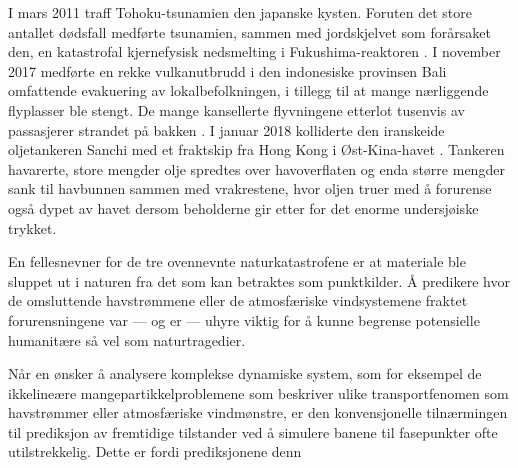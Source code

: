 I mars 2011 traff Tohoku-tsunamien den japanske kysten. Foruten det store
antallet dødsfall medførte tsunamien, sammen med jordskjelvet som forårsaket
den, en katastrofal kjernefysisk nedsmelting i Fukushima-reaktoren
\parencite{atomic2015fukushima}. I
november 2017 medførte en rekke vulkanutbrudd i den indonesiske provinsen
Bali omfattende evakuering av lokalbefolkningen, i tillegg til at mange
nærliggende flyplasser ble stengt. De mange kansellerte flyvningene etterlot
tusenvis av passasjerer strandet på bakken \parencite{kapoor2017bali}. I januar
2018 kolliderte den iranskeide oljetankeren Sanchi med et fraktskip fra Hong
Kong i Øst-Kina-havet \parencite{obayashi2018stricken}.
Tankeren havarerte, store mengder olje spredtes over havoverflaten og enda
større mengder sank til havbunnen sammen med vrakrestene, hvor oljen truer
med å forurense også dypet av havet dersom beholderne gir etter for det
enorme undersjøiske trykket.

En fellesnevner for de tre ovennevnte naturkatastrofene er at materiale
ble sluppet ut i naturen fra det som kan betraktes som punktkilder. Å predikere
hvor de omsluttende havstrømmene eller de atmosfæriske vindsystemene fraktet
forurensningene var --- og er --- uhyre viktig for å kunne begrense potensielle
humanitære så vel som naturtragedier.

Når en ønsker å analysere komplekse dynamiske system, som for eksempel de
ikkelineære mangepartikkelproblemene som beskriver ulike transportfenomen
som havstrømmer eller atmosfæriske vindmønstre, er den konvensjonelle
tilnærmingen til prediksjon av fremtidige tilstander ved å simulere
banene til fasepunkter ofte utilstrekkelig. Dette er fordi prediksjonene
denn


